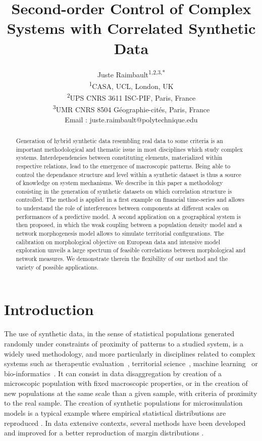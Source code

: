 \documentclass{article}
\title{Second-order Control of Complex Systems with Correlated Synthetic Data}
\date{}
\author{Juste Raimbault\textsuperscript{1,2,3,*}\medskip\\
\textsuperscript{1}CASA, UCL, London, UK\\
\textsuperscript{2}UPS CNRS 3611 ISC-PIF, Paris, France\\
\textsuperscript{3}UMR CNRS 8504 G{\'e}ographie-cit{\'e}s, Paris, France\medskip\\
Email : juste.raimbault@polytechnique.edu}
\begin{document}
\maketitle


\begin{abstract} %
\justify
Generation of hybrid synthetic data resembling real data to some criteria is an important methodological and thematic issue in most disciplines which study complex systems. Interdependencies between constituting elements, materialized within respective relations, lead to the emergence of macroscopic patterns. Being able to control the dependance structure and level within a synthetic dataset is thus a source of knowledge on system mechanisms. We describe in this paper a methodology consisting in the generation of synthetic datasets on which correlation structure is controlled. The method is applied in a first example on financial time-series and allows to understand the role of interferences between components at different scales on performances of a predictive model. A second application on a geographical system is then proposed, in which the weak coupling between a population density model and a network morphogenesis model allows to simulate territorial configurations. The calibration on morphological objective on European data and intensive model exploration unveils a large spectrum of feasible correlations between morphological and network measures. We demonstrate therein the flexibility of our method and the variety of possible applications.
\end{abstract}




\justify


\section*{Introduction}



The use of synthetic data, in the sense of statistical populations generated randomly under constraints of proximity of patterns to a studied system, is a widely used methodology, and more particularly in disciplines related to complex systems such as therapeutic evaluation~\cite{abadie2010synthetic}, territorial science~\cite{moeckel2003creating,pritchard2009advances}, machine learning~\cite{bolon2013review} or bio-informatics~\cite{van2006syntren}. It can consist in data disaggregation by creation of a microscopic population with fixed macroscopic properties, or in the creation of new populations at the same scale than a given sample, with criteria of proximity to the real sample. The creation of synthetic populations for microsimulation models is a typical example where empirical statistical distributions are reproduced \cite{muller2010population}. In data extensive contexts, several methods have been developed and improved for a better reproduction of margin distributions \cite{barthelemy2013synthetic}.
\end{document}
